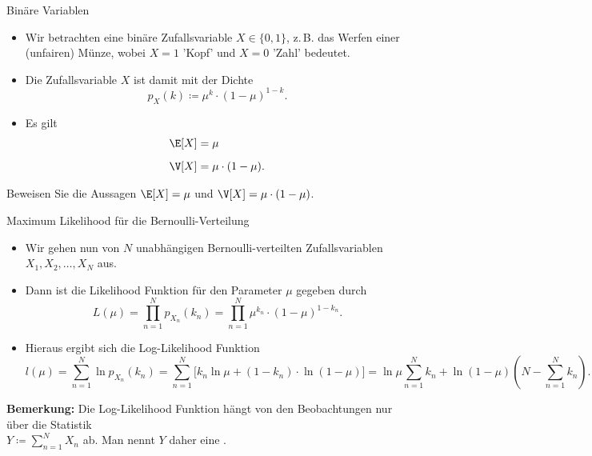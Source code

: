 \begin{frame}{Binäre Variablen}{}
	\begin{itemize}
		\item Wir betrachten eine binäre Zufallsvariable $X \in \{ 0, 1 \}$, z.\,B. das Werfen einer (unfairen) Münze,
			wobei $X = 1$ 'Kopf' und $X = 0$ 'Zahl' bedeutet.
		\item Die Zufallsvariable $X$ ist damit  mit der Dichte
		\begin{equation*} \label{eq:bernoulli}
			p_X(k) \coloneqq \mu^k \cdot (1 - \mu)^{1 - k}.
		\end{equation*}
		\item Es gilt
		\begin{align*}
			\E[X]
				&= \mu
		\\[2mm]
			\V[X]
				&= \mu \cdot (1 - \mu).
		\end{align*}
	\end{itemize}
	
	\begin{mytask}
		Beweisen Sie die Aussagen $\E[X] = \mu$ und $\V[X] = \mu \cdot (1 - \mu)$.
	\end{mytask}
\end{frame}


\begin{frame}{Maximum Likelihood für die Bernoulli-Verteilung}{}
	\begin{itemize}
		\item Wir gehen nun von $N$ unabhängigen Bernoulli-verteilten Zufallsvariablen $X_1, X_2, \ldots, X_N$ aus.
		\item Dann ist die Likelihood Funktion für den Parameter $\mu$ gegeben durch
		\begin{equation*}
			L(\mu) = \prod_{n=1}^N p_{X_n}(k_n) = \prod_{n=1}^N \mu^{k_n} \cdot (1 - \mu)^{1 - k_n}.
		\end{equation*}
		\item Hieraus ergibt sich die Log-Likelihood Funktion
		\begin{equation*}
			l(\mu)
				= \sum_{n=1}^N \ln p_{X_n}(k_n)
				= \sum_{n=1}^N \bigl[ k_n \ln \mu + (1 - k_n) \cdot \ln(1 - \mu) \bigr]
				= \ln \mu \sum_{n=1}^N k_n + \ln(1 - \mu) \left( N - \sum_{n=1}^N k_n \right).
		\end{equation*}
	\end{itemize}
	
	\begin{boxGray}
		\textbf{Bemerkung:} Die Log-Likelihood Funktion hängt von den Beobachtungen nur über die Statistik \\
		$Y \coloneqq \sum_{n=1}^N X_n$ ab. Man nennt $Y$ daher eine .
	\end{boxGray}
\end{frame}


